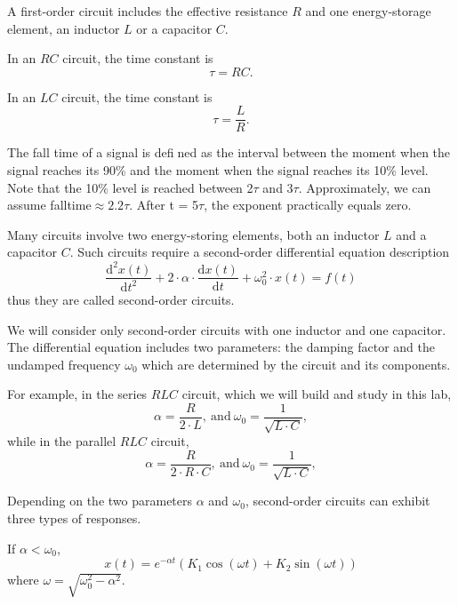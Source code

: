 \documentclass[a4paper]{report}
\begin{document}
	A first-order circuit includes the effective resistance $R$ and one energy-storage element, an inductor $L$ or a capacitor $C$.
	
	In an $RC$ circuit, the time constant is
	\begin{equation*}
		\tau=RC.
	\end{equation*}
	
	In an $LC$ circuit, the time constant is
	\begin{equation*}
		\tau=\dfrac{L}{R}.
	\end{equation*}
	
	The fall time of a signal is defined as the interval between the moment when the signal reaches its 90\% and the moment when the signal reaches its 10\% level. Note that the 10\% level is reached between 2$\tau$ and 3$\tau$. Approximately, we can assume falltime$\approx2.2\tau$. After t = 5$\tau$, the exponent practically equals zero.
	
	Many circuits involve two energy-storing elements, both an inductor $L$ and a capacitor $C$. Such circuits require a second-order differential equation description
	\begin{equation*}
		\dfrac{\mathrm{d}^2x(t)}{\mathrm{d}t^2}+2\cdot\alpha\cdot\dfrac{\mathrm{d}x(t)}{\mathrm{d}t}+\omega_0^2\cdot x(t)=f(t)
	\end{equation*}
	thus they are called second-order circuits.
	
	We will consider only second-order circuits with one inductor and one capacitor. The differential equation includes two parameters: the damping factor and the undamped frequency $\omega_0$ which are determined by the circuit and its components.
	
	For example, in the series $RLC$ circuit, which we will build and study in this lab,
	\begin{equation*}
		\alpha=\dfrac{R}{2\cdot L},\ \mathrm{and}\ \omega_0=\dfrac{1}{\sqrt{L\cdot C}},
	\end{equation*}
	while in the parallel $RLC$ circuit,
	\begin{equation*}
		\alpha=\dfrac{R}{2\cdot R\cdot C},\ \mathrm{and}\ \omega_0=\dfrac{1}{\sqrt{L\cdot C}},
	\end{equation*}
	
	Depending on the two parameters $\alpha$ and $\omega_0$, second-order circuits can exhibit three types of responses.
	
	If $\alpha<\omega_0$,
	\begin{equation*}
		x(t)=e^{-\alpha t}(K_1\cos{(\omega t)}+K_2\sin{(\omega t)})
	\end{equation*}
	where $\omega=\sqrt{\omega_0^2-\alpha^2}$.
	
\end{document}
